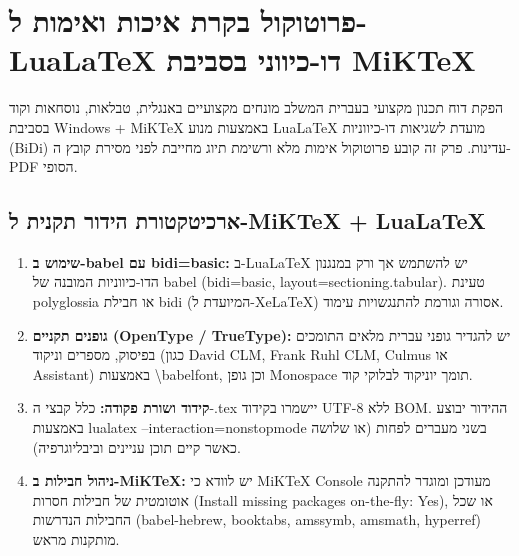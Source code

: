 
\section{פרוטוקול בקרת איכות ואימות ל-\textenglish{LuaLaTeX} דו-כיווני בסביבת \textenglish{MiKTeX}}
\label{sec:lualatex-bidi-qa}

הפקת דוח תכנון מקצועי בעברית המשלב מונחים מקצועיים באנגלית, טבלאות, נוסחאות וקוד בסביבת \textenglish{Windows + MiKTeX} באמצעות מנוע \textenglish{LuaLaTeX} מועדת לשגיאות דו-כיווניות (\textenglish{BiDi}) עדינות. פרק זה קובע פרוטוקול אימות מלא ורשימת תיוג מחייבת לפני מסירת קובץ ה-\textenglish{PDF} הסופי.

\subsection{ארכיטקטורת הידור תקנית ל-\textenglish{MiKTeX + LuaLaTeX}}
\begin{enumerate}
    \item \textbf{שימוש ב-\textenglish{babel} עם \textenglish{bidi=basic}:} ב-\textenglish{LuaLaTeX} יש להשתמש אך ורק במנגנון הדו-כיווניות המובנה של \textenglish{babel} (\textenglish{bidi=basic, layout=sectioning.tabular}). טעינת \textenglish{polyglossia} או חבילת \textenglish{bidi} (המיועדת ל-\textenglish{XeLaTeX}) אסורה וגורמת להתנגשויות עימוד.
    \item \textbf{גופנים תקניים (\textenglish{OpenType / TrueType}):} יש להגדיר גופני עברית מלאים התומכים בפיסוק, מספרים וניקוד (כגון \textenglish{David CLM}, \textenglish{Frank Ruhl CLM}, \textenglish{Culmus} או \textenglish{Assistant}) באמצעות \textenglish{\textbackslash babelfont}, וכן גופן \textenglish{Monospace} תומך יוניקוד לבלוקי קוד.
    \item \textbf{קידוד ושורת פקודה:} כלל קבצי ה-\textenglish{.tex} יישמרו בקידוד \textenglish{UTF-8} ללא \textenglish{BOM}. ההידור יבוצע באמצעות \textenglish{lualatex --interaction=nonstopmode} בשני מעברים לפחות (או שלושה כאשר קיים תוכן עניינים וביבליוגרפיה).
    \item \textbf{ניהול חבילות ב-\textenglish{MiKTeX}:} יש לוודא כי \textenglish{MiKTeX Console} מעודכן ומוגדר להתקנה אוטומטית של חבילות חסרות (\textenglish{Install missing packages on-the-fly: Yes}), או שכל החבילות הנדרשות (\textenglish{babel-hebrew}, \textenglish{booktabs}, \textenglish{amssymb}, \textenglish{amsmath}, \textenglish{hyperref}) מותקנות מראש.
\end{enumerate}

